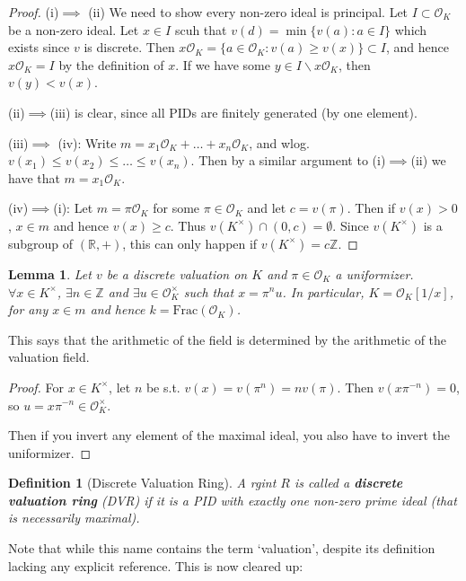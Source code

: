 \documentclass[]{article}
\theoremstyle{custhm}
\theoremstyle{cusdef}
\newtheorem{defin}[theorem]{Definition}
\theoremstyle{custhm}
\newtheorem{lemma}[theorem]{Lemma}
\theoremstyle{custhm}
\theoremstyle{custhm}
\theoremstyle{custhm}
\theoremstyle{cusdef}
\theoremstyle{remark}
\newcommand{\Z}{\mathbb{Z}}
\newcommand{\R}{\mathbb{R}}
\newcommand{\undf}[1]{\textit{\textbf{#1}}}
\renewcommand{\O}{\mathcal{O}}
\begin{document}
\begin{proof}
(i)$\implies$ (ii) We need to show every non-zero ideal is principal. Let $I\subset \O_K$ be a non-zero ideal. Let $x\in I$ scuh that $v(d) = \min \{v(a):a\in I\}$ which exists since $v$ is discrete.  Then $x\O_K = \{a\in \O_K : v(a)\ge v(x)\}\subset I$, and hence $x\O_K = I$ by the definition of $x$. If we have some $y\in I\backslash x\O_K$, then $v(y) < v(x)$.

(ii)$\implies$(iii) is clear, since all PIDs are finitely generated (by one element).

(iii)$\implies$ (iv): Write $m = x_1\O_K + \dots+x_n\O_K$, and wlog. $v(x_1)\le v(x_2)\le \dots \le v(x_n)$. Then by a similar argument to (i)$\implies$(ii) we have that $m = x_1\O_K$.

(iv)$\implies$(i): Let $m = \pi\O_K$ for some $\pi \in \O_K$ and let $c = v(\pi)$. Then if $v(x) > 0$, $x\in m$ and hence $v(x)\ge c$. Thus $v(K^\times)\cap(0,c) = \emptyset$. Since $v(K^\times)$ is a subgroup of $(\R,+)$, this can only happen if $v(K^\times) = c\Z$.
\end{proof}
\begin{lemma}
	Let $v$ be a discrete valuation on $K$ and $\pi \in \O_K$ a uniformizer. $\forall x \in K^\times$, $\exists n\in \Z$ and $\exists u\in \O_K^\times$ such that $x = \pi^n u$. In particular, $K = \O_K[1/x]$, for any $x\in m$ and hence $k = \textrm{Frac}(\O_K)$.
\end{lemma}
This says that the arithmetic of the field is determined by the arithmetic of the valuation field.
\begin{proof}
For $x \in K^\times$, let $n$ be s.t. $v(x) = v(\pi^n) = nv(\pi)$. Then $v(x\pi^{-n}) = 0$, so $u = x\pi^{-n}\in \O_K^\times$.

Then if you invert any element of the maximal ideal, you also have to invert the uniformizer.
\end{proof}
\begin{defin}[Discrete Valuation Ring]
A rgint $R$ is called a \undf{discrete valuation ring} (DVR) if it is a PID with exactly one non-zero prime ideal (that is necessarily maximal).
\end{defin}
Note that while this name contains the term `valuation', despite its definition lacking any explicit reference. This is now cleared up:
\end{document}
